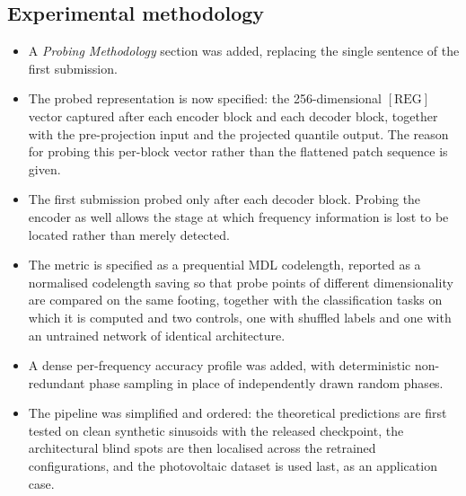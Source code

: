 \subsection{Experimental methodology}
\begin{itemize}
  \item A \emph{Probing Methodology} section was added, replacing the single
        sentence of the first submission.
  \item The probed representation is now specified: the 256-dimensional
        $[\mathrm{REG}]$ vector captured after each encoder block and each
        decoder block, together with the pre-projection input and the projected
        quantile output. The reason for probing this per-block vector rather
        than the flattened patch sequence is given.
  \item The first submission probed only after each decoder block. Probing the
        encoder as well allows the stage at which frequency information is lost
        to be located rather than merely detected.
  \item The metric is specified as a prequential MDL codelength, reported as a
        normalised codelength saving so that probe points of different
        dimensionality are compared on the same footing, together with the
        classification tasks on which it is computed and two controls, one with
        shuffled labels and one with an untrained network of identical
        architecture.
  \item A dense per-frequency accuracy profile was added, with deterministic
        non-redundant phase sampling in place of independently drawn random
        phases.
  \item The pipeline was simplified and ordered: the theoretical predictions
        are first tested on clean synthetic sinusoids with the released
        checkpoint, the architectural blind spots are then localised across the
        retrained configurations, and the photovoltaic dataset is used last, as
        an application case.
\end{itemize}

